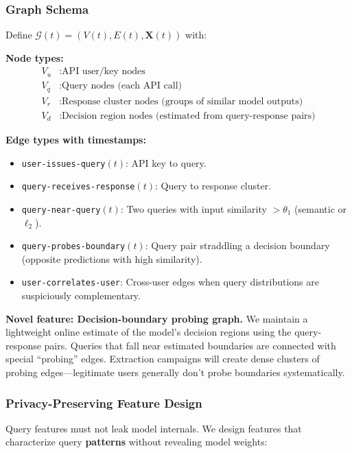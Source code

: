 \documentclass[12pt,a4paper]{article}
\newcommand{\calG}{\mathcal{G}}
\begin{document}
\subsubsection{Graph Schema}

Define $\calG(t) = (V(t), E(t), \mathbf{X}(t))$ with:

\textbf{Node types:}
\begin{align}
    V_u &: \text{API user/key nodes} \\
    V_q &: \text{Query nodes (each API call)} \\
    V_r &: \text{Response cluster nodes (groups of similar model outputs)} \\
    V_d &: \text{Decision region nodes (estimated from query-response pairs)}
\end{align}

\textbf{Edge types with timestamps:}
\begin{itemize}
    \item \texttt{user-issues-query}$(t)$: API key to query.
    \item \texttt{query-receives-response}$(t)$: Query to response cluster.
    \item \texttt{query-near-query}$(t)$: Two queries with input similarity $> \theta_1$ (semantic or $\ell_2$).
    \item \texttt{query-probes-boundary}$(t)$: Query pair straddling a decision boundary (opposite predictions with high similarity).
    \item \texttt{user-correlates-user}: Cross-user edges when query distributions are suspiciously complementary.
\end{itemize}

\textbf{Novel feature: Decision-boundary probing graph.} We maintain a lightweight online estimate of the model's decision regions using the query-response pairs. Queries that fall near estimated boundaries are connected with special ``probing'' edges. Extraction campaigns will create dense clusters of probing edges---legitimate users generally don't probe boundaries systematically.

\subsubsection{Privacy-Preserving Feature Design}

Query features must not leak model internals. We design features that characterize query \textbf{patterns} without revealing model weights:
\end{document}
